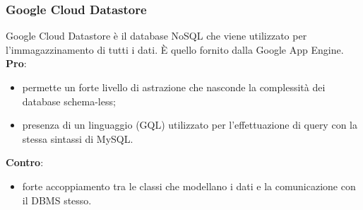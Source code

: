 		\subsubsection{Google Cloud Datastore} %
		\label{ssub:datastore}
		Google Cloud Datastore è il database NoSQL che viene utilizzato per l'immagazzinamento di tutti i dati. È quello fornito dalla Google App Engine. \newline
		\textbf{Pro}:
			\begin{itemize}
				\item permette un forte livello di astrazione che nasconde la complessità dei database schema-less;
				\item presenza di un linguaggio (GQL) utilizzato per l'effettuazione di query con la stessa sintassi di MySQL.
			\end{itemize}
			\noindent
			\textbf{Contro}:
				\begin{itemize}
					\item forte accoppiamento tra le classi che modellano i dati e la comunicazione con il DBMS stesso.
				\end{itemize}
			\noindent



